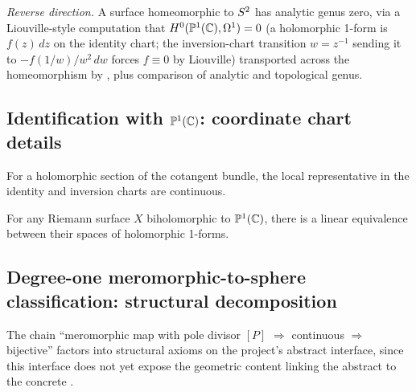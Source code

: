 \begin{formalizationnote}
\emph{Reverse direction.} A surface homeomorphic to \(S^{2}\) has analytic
genus zero, via a Liouville-style computation that
\(H^{0}(\mathbb{P}^{1}(\mathbb{C}),\Omega^{1})=0\) (a holomorphic 1-form is \(f(z)\,dz\) on the
identity chart; the inversion-chart transition \(w=z^{-1}\) sending it to
\(-f(1/w)/w^{2}\,dw\) forces \(f\equiv0\) by Liouville) transported across the
homeomorphism by
, plus comparison of
analytic and topological genus.
\end{formalizationnote}

\subsection{Identification with \(\mathbb{P}^{1}(\mathbb{C})\): coordinate chart details}

\begin{lemma}
\label{lem:section-localRepr-continuity}
For a holomorphic section of the cotangent bundle, the local representative in the identity and inversion charts are continuous.
\leanok
\end{lemma}

\begin{theorem}
\label{lem:holomorphic-one-form-linearEquiv-to-OnePointCx}
For any Riemann surface \(X\) biholomorphic to \(\mathbb{P}^{1}(\mathbb{C})\), there is a linear equivalence between their spaces of holomorphic 1-forms.
\leanok
\end{theorem}

\subsection{Degree-one meromorphic-to-sphere classification: structural decomposition}
\label{sec:degree-one-mer-decomp}

The chain ``meromorphic map with pole divisor \([P]\) \(\Rightarrow\)
continuous \(\Rightarrow\) bijective'' factors into structural axioms
on the project's abstract  interface,
since this interface does not yet expose the geometric content
linking the abstract  to the concrete .


